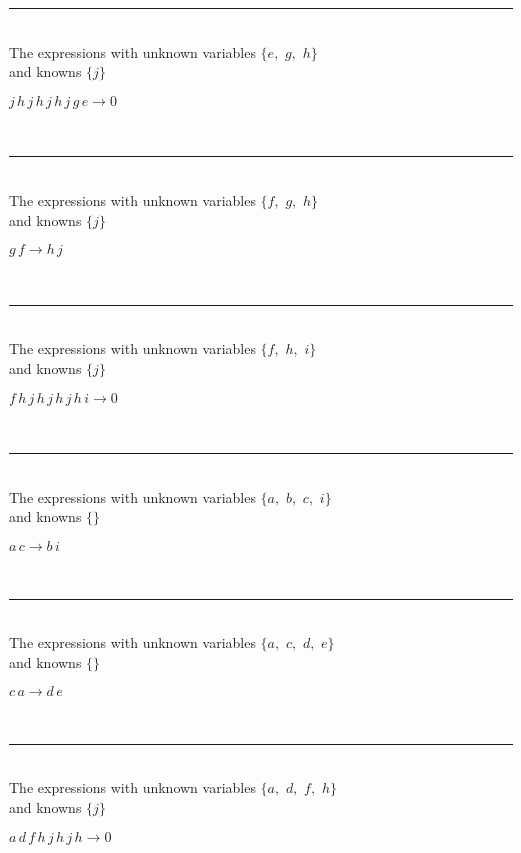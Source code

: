 \rule[3pt]{6in}{.7pt}\\
The expressions with unknown variables $\{e,
$ $
g,
$ $
h\}$\\
and knowns $\{j\}$\smallskip\\
\begin{minipage}{6in}
$
j\,
 h\,
 j\,
 h\,
 j\,
 h\,
 j\,
 g\,
 e\rightarrow 0
$
\end{minipage}\\
\rule[3pt]{6in}{.7pt}\\
The expressions with unknown variables $\{f,
$ $
g,
$ $
h\}$\\
and knowns $\{j\}$\smallskip\\
\begin{minipage}{6in}
$
g\,
 f\rightarrow h\,
 j
$
\end{minipage}\\
\rule[3pt]{6in}{.7pt}\\
The expressions with unknown variables $\{f,
$ $
h,
$ $
i\}$\\
and knowns $\{j\}$\smallskip\\
\begin{minipage}{6in}
$
f\,
 h\,
 j\,
 h\,
 j\,
 h\,
 j\,
 h\,
 i\rightarrow 0
$
\end{minipage}\\
\rule[3pt]{6in}{.7pt}\\
The expressions with unknown variables $\{a,
$ $
b,
$ $
c,
$ $
i\}$\\
and knowns $\{\}$\smallskip\\
\begin{minipage}{6in}
$
a\,
 c\rightarrow b\,
 i
$
\end{minipage}\\
\rule[3pt]{6in}{.7pt}\\
The expressions with unknown variables $\{a,
$ $
c,
$ $
d,
$ $
e\}$\\
and knowns $\{\}$\smallskip\\
\begin{minipage}{6in}
$
c\,
 a\rightarrow d\,
 e
$
\end{minipage}\\
\rule[3pt]{6in}{.7pt}\\
The expressions with unknown variables $\{a,
$ $
d,
$ $
f,
$ $
h\}$\\
and knowns $\{j\}$\smallskip\\
\begin{minipage}{6in}
$
a\,
 d\,
 f\,
 h\,
 j\,
 h\,
 j\,
 h\rightarrow 0
$
\end{minipage}\\
